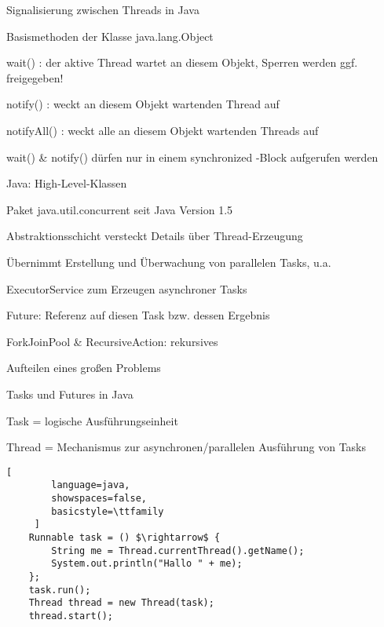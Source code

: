 \documentclass[10pt]{article}
\begin{document}
\begin{itemize*}
\begin{itemize*}
\begin{itemize*}
    \begin{itemize*}
      \item  Signalisierung zwischen Threads in Java
      \item Basismethoden der Klasse java.lang.Object
      \item wait() : der aktive Thread wartet an diesem Objekt, Sperren werden ggf. freigegeben!
      \item notify() : weckt an diesem Objekt wartenden Thread auf
      \item notifyAll() : weckt alle an diesem Objekt wartenden Threads auf
      \item wait() \& notify() dürfen nur in einem synchronized -Block aufgerufen werden
    \end{itemize*}
    \item Java: High-Level-Klassen
    \begin{itemize*}
      \item Paket java.util.concurrent seit Java Version 1.5
      \item Abstraktionsschicht versteckt Details über Thread-Erzeugung
      \item Übernimmt Erstellung und Überwachung von parallelen Tasks, u.a.
      \begin{itemize*}
        \item ExecutorService zum Erzeugen asynchroner Tasks
        \item Future: Referenz auf diesen Task bzw. dessen Ergebnis
        \item ForkJoinPool \& RecursiveAction: rekursives
        \item Aufteilen eines großen Problems
      \end{itemize*}
    \end{itemize*}
    \item Tasks und Futures in Java
    \begin{itemize*}
      \item Task = logische Ausführungseinheit
      \item Thread = Mechanismus zur asynchronen/parallelen Ausführung von Tasks
      \begin{lstlisting}[
        language=java,
        showspaces=false,
        basicstyle=\ttfamily
     ]
    Runnable task = () $\rightarrow$ {
        String me = Thread.currentThread().getName();
        System.out.println("Hallo " + me);
    };
    task.run();
    Thread thread = new Thread(task);
    thread.start();
    \end{lstlisting}

\end{itemize*}
\end{itemize*}
\end{itemize*}
\end{itemize*}
\end{document}
